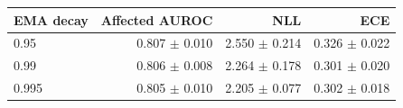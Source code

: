 \begin{tabular}{lrrr}
\toprule
EMA decay & Affected AUROC & NLL & ECE \\
\midrule
0.95 & 0.807 $\pm$ 0.010 & 2.550 $\pm$ 0.214 & 0.326 $\pm$ 0.022 \\
0.99 & 0.806 $\pm$ 0.008 & 2.264 $\pm$ 0.178 & 0.301 $\pm$ 0.020 \\
0.995 & 0.805 $\pm$ 0.010 & 2.205 $\pm$ 0.077 & 0.302 $\pm$ 0.018 \\
\bottomrule
\end{tabular}